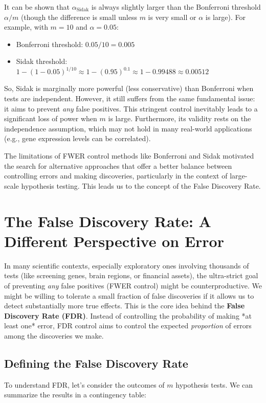 \documentclass[12pt]{book}
\begin{document}
It can be shown that $\alpha_{\text{Sidak}}$ is always slightly larger than the Bonferroni threshold $\alpha/m$ (though the difference is small unless $m$ is very small or $\alpha$ is large). For example, with $m=10$ and $\alpha=0.05$:
\begin{itemize}
    \item Bonferroni threshold: $0.05 / 10 = 0.005$
    \item Sidak threshold: $1 - (1-0.05)^{1/10} \approx 1 - (0.95)^{0.1} \approx 1 - 0.99488 \approx 0.00512$
\end{itemize}
So, Sidak is marginally more powerful (less conservative) than Bonferroni when tests are independent. However, it still suffers from the same fundamental issue: it aims to prevent \emph{any} false positives. This stringent control inevitably leads to a significant loss of power when $m$ is large. Furthermore, its validity rests on the independence assumption, which may not hold in many real-world applications (e.g., gene expression levels can be correlated).

The limitations of FWER control methods like Bonferroni and Sidak motivated the search for alternative approaches that offer a better balance between controlling errors and making discoveries, particularly in the context of large-scale hypothesis testing. This leads us to the concept of the False Discovery Rate.

\chapter{The False Discovery Rate: A Different Perspective on Error}
\label{chap:FDR}

In many scientific contexts, especially exploratory ones involving thousands of tests (like screening genes, brain regions, or financial assets), the ultra-strict goal of preventing \emph{any} false positives (FWER control) might be counterproductive. We might be willing to tolerate a small fraction of false discoveries if it allows us to detect substantially more true effects. This is the core idea behind the \textbf{False Discovery Rate (FDR)}. Instead of controlling the probability of making *at least one* error, FDR control aims to control the expected \emph{proportion} of errors among the discoveries we make.

\section{Defining the False Discovery Rate}
To understand FDR, let's consider the outcomes of $m$ hypothesis tests. We can summarize the results in a contingency table:
\end{document}
